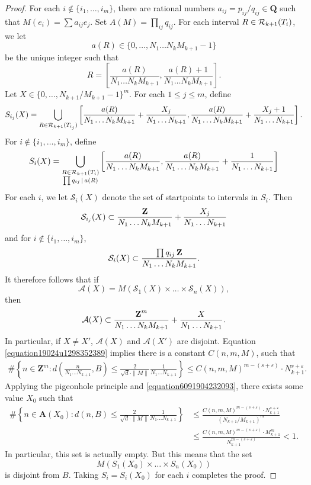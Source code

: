 \begin{proof}
    For each $i \not \in \{ i_1, \dots, i_m \}$, there are rational numbers $a_{ij} = p_{ij}/q_{ij} \in \mathbf{Q}$ such that $M(e_i) = \sum a_{ij} e_j$. Set $A(M) = \prod_{ij} q_{ij}$. For each interval $R \in \operatorname{\mathcal{R}}_{k+1}(T_i)$, we let
    \[ a(R) \in \{ 0, \dots, N_1 \dots N_k M_{k+1} - 1 \} \]
    be the unique integer such that
    \[ R = \left[ \frac{a(R)}{N_1 \dots N_k M_{k+1}}, \frac{a(R) + 1}{N_1 \dots N_k M_{k+1}} \right]. \]
    Let $X \in \{ 0, \dots, N_{k+1}/M_{k+1} - 1 \}^m$. For each $1 \leq j \leq m$, define
    \[ S_{i_j}(X) = \bigcup_{R \in \operatorname{\mathcal{R}}_{k+1}(T_{i_j})} \left[ \frac{a(R)}{N_1 \dots N_k M_{k+1}} + \frac{X_j}{N_1 \dots N_{k+1}}, \frac{a(R)}{N_1 \dots N_k M_{k+1}} + \frac{X_j + 1}{N_1 \dots N_{k+1}} \right]. \]
    For $i \not \in \{ i_1, \dots, i_m \}$, define
    \[ S_i(X) = \bigcup_{\substack{R \in \operatorname{\mathcal{R}}_{k+1}(T_i)\\ \prod q_{ij} \operatorname{\mid} a(R)}} \left[ \frac{a(R)}{N_1 \dots N_k M_{k+1}}, \frac{a(R)}{N_1 \dots N_k M_{k+1}} + \frac{1}{N_1 \dots N_{k+1}} \right] \]
    For each $i$, we let $\mathcal{S}_i(X)$ denote the set of startpoints to intervals in $S_i$. Then
    \[ \mathcal{S}_{i_j}(X) \subset \frac{\operatorname{\mathbf{Z}}}{N_1 \dots N_k M_{k+1}} + \frac{X_j}{N_1 \dots N_{k+1}} \]
    and for $i \not \in \{ i_1, \dots, i_m \}$,
    \[ \mathcal{S}_i(X) \subset \frac{\prod q_{ij} \operatorname{\mathbf{Z}}}{N_1 \dots N_k M_{k+1}}. \]
    It therefore follows that if
    \[ \mathcal{A}(X) = M(\mathcal{S}_1(X) \times \dots \times \mathcal{S}_n(X)), \]
    then
    \[ \mathcal{A}(X) \subset \frac{\operatorname{\mathbf{Z}}^m}{N_1 \dots N_k M_{k+1}} + \frac{X}{N_1 \dots N_{k+1}}. \]
    In particular, if $X \neq X'$, $\mathcal{A}(X)$ and $\mathcal{A}(X')$ are disjoint. Equation \eqref{equation19024u1298352389} implies there is a constant $C(n,m,M)$, such that
    \begin{align*}
        \# \left\{ n \in \mathbf{Z}^m : d \left( \frac{n}{N_1 \dots N_{k+1}}, B \right) \leq \frac{2}{\sqrt{d} \cdot \| M \|} \frac{1}{N_1 \dots N_{k+1}} \right\} \leq C(n,m,M)^{m - (s + \varepsilon)} \cdot N_{k+1}^{s + \varepsilon}.
    \end{align*}
    Applying the pigeonhole principle and \eqref{equation6091904232093}, there exists some value $X_0$ such that
    \begin{align*}
        \# \left\{ n \in \mathbf{A}(X_0) : d(n,B) \leq \frac{2}{\sqrt{d} \cdot \| M \|} \frac{1}{N_1 \dots N_{k+1}} \right\} &\leq \frac{C(n,m,M)^{m - (s + \varepsilon)} \cdot N_{k+1}^{s + \varepsilon}}{(N_{k+1}/M_{k+1})^m}\\
        &\leq \frac{C(n,m,M)^{m - (s + \varepsilon)} \cdot M_{k+1}^m}{N_{k+1}^{m - (s + \varepsilon)}} < 1.
    \end{align*}
    In particular, this set is actually empty. But this means that the set
    \[ M(S_1(X_0) \times \dots \times S_n(X_0)) \]
    is disjoint from $B$. Taking $S_i = S_i(X_0)$ for each $i$ completes the proof.
\end{proof}

